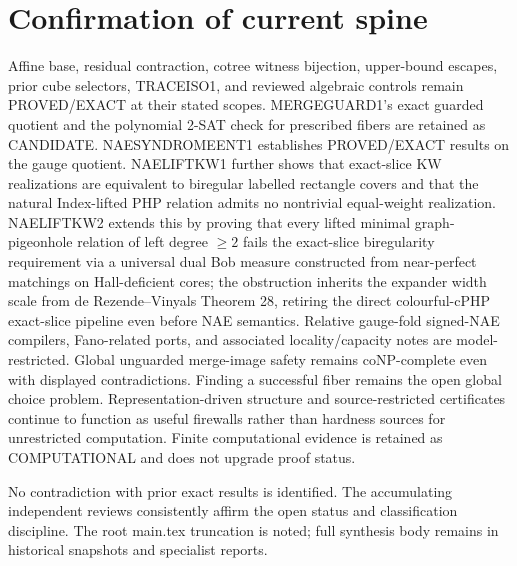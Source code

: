 \documentclass[11pt]{article}
\begin{document}
\section{Confirmation of current spine}
Affine base, residual contraction, cotree witness bijection, upper-bound escapes, prior cube selectors, TRACEISO1, and reviewed algebraic controls remain PROVED/EXACT at their stated scopes. MERGEGUARD1's exact guarded quotient and the polynomial 2-SAT check for prescribed fibers are retained as CANDIDATE. NAESYNDROMEENT1 establishes PROVED/EXACT results on the gauge quotient. NAELIFTKW1 further shows that exact-slice KW realizations are equivalent to biregular labelled rectangle covers and that the natural Index-lifted PHP relation admits no nontrivial equal-weight realization. NAELIFTKW2 extends this by proving that every lifted minimal graph-pigeonhole relation of left degree $\ge 2$ fails the exact-slice biregularity requirement via a universal dual Bob measure constructed from near-perfect matchings on Hall-deficient cores; the obstruction inherits the expander width scale from de Rezende--Vinyals Theorem 28, retiring the direct colourful-cPHP exact-slice pipeline even before NAE semantics. Relative gauge-fold signed-NAE compilers, Fano-related ports, and associated locality/capacity notes are model-restricted. Global unguarded merge-image safety remains coNP-complete even with displayed contradictions. Finding a successful fiber remains the open global choice problem. Representation-driven structure and source-restricted certificates continue to function as useful firewalls rather than hardness sources for unrestricted computation. Finite computational evidence is retained as COMPUTATIONAL and does not upgrade proof status.

No contradiction with prior exact results is identified. The accumulating independent reviews consistently affirm the open status and classification discipline. The root main.tex truncation is noted; full synthesis body remains in historical snapshots and specialist reports.
\end{document}
